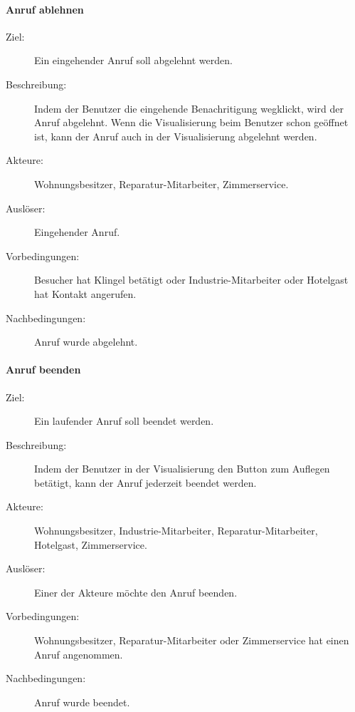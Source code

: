 \paragraph{\large{Anruf ablehnen}}
    \begin{description}
        \item[Ziel:] Ein eingehender Anruf soll abgelehnt werden.
        \item[Beschreibung:] Indem der Benutzer die eingehende Benachritigung wegklickt, wird der Anruf abgelehnt.
            Wenn die Visualisierung beim Benutzer schon geöffnet ist, kann der Anruf auch in der Visualisierung abgelehnt werden.
        \item[Akteure:] Wohnungsbesitzer, Reparatur-Mitarbeiter, Zimmerservice.
        \item[Auslöser:] Eingehender Anruf.
        \item[Vorbedingungen:] Besucher hat Klingel betätigt oder Industrie-Mitarbeiter oder Hotelgast hat Kontakt angerufen.
        \item[Nachbedingungen:] Anruf wurde abgelehnt.
    \end{description}

\paragraph{\large{Anruf beenden}}
    \begin{description}
        \item[Ziel:] Ein laufender Anruf soll beendet werden.
        \item[Beschreibung:] Indem der Benutzer in der Visualisierung den Button zum Auflegen betätigt, kann der Anruf jederzeit beendet werden.
        \item[Akteure:] Wohnungsbesitzer, Industrie-Mitarbeiter, Reparatur-Mitarbeiter, Hotelgast, Zimmerservice.
        \item[Auslöser:] Einer der Akteure möchte den Anruf beenden.
        \item[Vorbedingungen:] Wohnungsbesitzer, Reparatur-Mitarbeiter oder Zimmerservice hat einen Anruf angenommen.
        \item[Nachbedingungen:] Anruf wurde beendet.
    \end{description}

